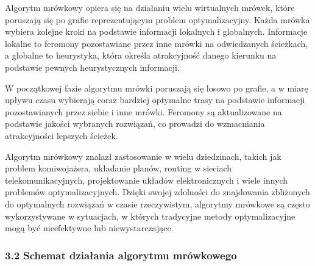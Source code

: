 \documentclass[11pt]{article}
\begin{document}
Algorytm mrówkowy opiera się na działaniu wielu wirtualnych mrówek,
które poruszają się po grafie reprezentującym problem optymalizacyjny.
Każda mrówka wybiera kolejne kroki na podstawie informacji lokalnych i
globalnych. Informacje lokalne to feromony pozostawiane przez inne
mrówki na odwiedzanych ścieżkach, a globalne to heurystyka, która
określa atrakcyjność danego kierunku na podstawie pewnych heurystycznych
informacji.

W początkowej fazie algorytmu mrówki poruszają się losowo po grafie, a w
miarę upływu czasu wybierają coraz bardziej optymalne trasy na podstawie
informacji pozostawianych przez siebie i inne mrówki. Feromony są
aktualizowane na podstawie jakości wybranych rozwiązań, co prowadzi do
wzmacniania atrakcyjności lepszych ścieżek.

Algorytm mrówkowy znalazł zastosowanie w wielu dziedzinach, takich jak
problem komiwojażera, układanie planów, routing w sieciach
telekomunikacyjnych, projektowanie układów elektronicznych i wiele
innych problemów optymalizacyjnych. Dzięki swojej zdolności do
znajdowania zbliżonych do optymalnych rozwiązań w czasie rzeczywistym,
algorytmy mrówkowe są często wykorzystywane w sytuacjach, w których
tradycyjne metody optymalizacyjne mogą być nieefektywne lub
niewystarczające.

\hypertarget{schemat-dziaux142ania-algorytmu-mruxf3wkowego}{%
\subsubsection{3.2 Schemat działania algorytmu
mrówkowego}\label{schemat-dziaux142ania-algorytmu-mruxf3wkowego}}
\end{document}
